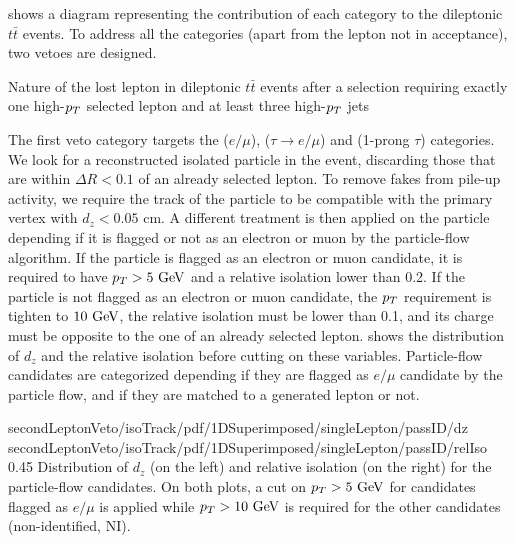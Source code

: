      shows a diagram representing
    the contribution of each category to the dileptonic $t\bar{t}$ events. To address all
    the categories (apart from the lepton not in acceptance), two vetoes are designed.

                 {Nature of the lost lepton in dileptonic $t\bar{t}$ events after a selection
                 requiring exactly one high-$p_T$ selected lepton and at least three
                 high-$p_T$ jets}

    The first veto category targets the ($e/\mu$), ($\tau \rightarrow e/\mu$) and
    (1-prong $\tau$) categories. We look for a reconstructed isolated particle in the event,
    discarding those that are within $\Delta R < 0.1$ of an already selected lepton. To
    remove fakes from pile-up activity, we require the track of the particle to be
    compatible with the primary vertex with $d_z < 0.05$ cm. A different treatment is then
    applied on the particle depending if it is flagged or not as an electron or muon by the
    particle-flow algorithm. If the particle is flagged as an electron or muon candidate,
    it is required to have $p_T > 5~\text{GeV}$ and a relative isolation lower than 0.2.
    If the particle is not flagged as an electron or muon candidate, the $p_T$ requirement
    is tighten to $10~\text{GeV}$, the relative isolation must be lower than 0.1, and its charge
    must be opposite to the one of an already selected lepton.
     shows the distribution of $d_z$ and the
    relative isolation before cutting on these variables. Particle-flow candidates are categorized depending if
    they are flagged as $e/\mu$ candidate by the particle flow, and if they are matched to a
    generated lepton or not.

                     {secondLeptonVeto/isoTrack/pdf/1DSuperimposed/singleLepton/passID/dz}
                     {secondLeptonVeto/isoTrack/pdf/1DSuperimposed/singleLepton/passID/relIso}
                     {0.45}
                     {Distribution of $d_z$ (on the left) and relative isolation (on the right)
                     for the particle-flow candidates. On both plots, a cut on $p_T > 5~\text{GeV}$ for candidates
                     flagged as $e/\mu$ is applied while $p_T > 10~\text{GeV}$ is required for
                     the other candidates (non-identified, NI).}

